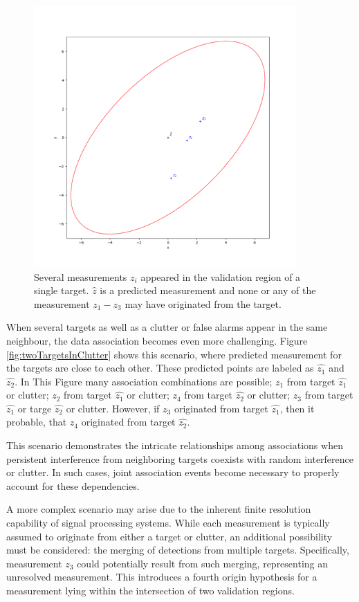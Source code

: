 \begin{figure}[h]
  \centering
  \includegraphics[width=10cm]{text/chapter_02/imgs/clutter_singleTarget}
  \caption{Several measurements $z_i$ appeared in the validation region of a single target. $\hat{z}$ is a predicted
  measurement and none or any of the measurement $z_1 - z_3$ may have originated from the target.}
  \label{fig:singleTargetInClutter}
\end{figure}

When several targets as well as a clutter or false alarms appear in the same neighbour, the data association becomes even more challenging. Figure \ref{fig:twoTargetsInClutter} shows this scenario, where predicted measurement for the targets are close to each other. These predicted points are labeled as $\hat{z_1}$ and $\hat{z_2}$. In This Figure many association combinations are possible; $z_1$ from target $\hat{z_1}$ or clutter; $z_2$ from target $\hat{z_1}$ or clutter; $z_4$ from target $\hat{z_2}$ or clutter; $z_3$ from target $\hat{z_1}$ or targe $\hat{z_2}$ or clutter. However, if $z_3$ originated from target $\hat{z_1}$, then it probable, that $z_4$ originated from target $\hat{z_2}$.

This scenario demonstrates the intricate relationships among associations when persistent interference from neighboring targets coexists with random interference or clutter. In such cases, joint association events become necessary to properly account for these dependencies.

A more complex scenario may arise due to the inherent finite resolution capability of signal processing systems. While each measurement is typically assumed to originate from either a target or clutter, an additional possibility must be considered: the merging of detections from multiple targets. Specifically, measurement $z_3$ could potentially result from such merging, representing an unresolved measurement. This introduces a fourth origin hypothesis for a measurement lying within the intersection of two validation regions.

